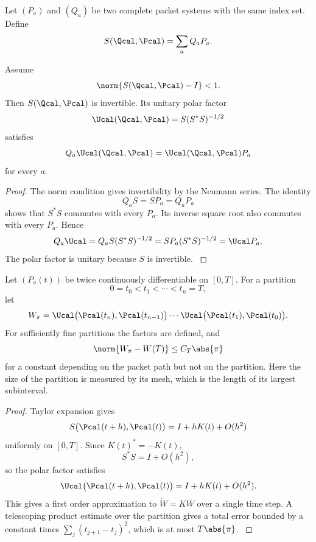 Let \((P_a)\) and \((Q_a)\) be two complete packet systems with the same index set. Define
\[
S(\Qcal,\Pcal)=\sum_aQ_aP_a.
\]

\begin{theorem}\label{strong:theorem:016}\label{strong:thm:direct_rotation}
Assume
\[
\norm{S(\Qcal,\Pcal)-I}<1.
\]
Then \(S(\Qcal,\Pcal)\) is invertible. Its unitary polar factor
\[
\Ucal(\Qcal,\Pcal)
=
S(S^*S)^{-1/2}
\]
satisfies
\[
Q_a\Ucal(\Qcal,\Pcal)
=
\Ucal(\Qcal,\Pcal)P_a
\]
for every \(a\).
\end{theorem}

\begin{proof}\label{strong:proof:025}
The norm condition gives invertibility by the Neumann series. The identity
\[
Q_aS=SP_a=Q_aP_a
\]
shows that \(S^*S\) commutes with every \(P_a\). Its inverse square root also commutes with every \(P_a\). Hence
\[
Q_a\Ucal
=Q_aS(S^*S)^{-1/2}
=SP_a(S^*S)^{-1/2}
=\Ucal P_a.
\]
The polar factor is unitary because \(S\) is invertible.
\label{strong:proof:025:end}\end{proof}

\begin{theorem}\label{strong:theorem:017}\label{strong:thm:short_rotation_convergence}
Let \((P_a(t))\) be twice continuously differentiable on \([0,T]\). For a partition
\[
0=t_0<t_1<\cdots<t_n=T,
\]
let
\[
W_\pi
=
\Ucal\bigl(\Pcal(t_n),\Pcal(t_{n-1})\bigr)
\cdots
\Ucal\bigl(\Pcal(t_1),\Pcal(t_0)\bigr).
\]
For sufficiently fine partitions the factors are defined, and
\[
\norm{W_\pi-W(T)}
\leq
C_T\abs{\pi}
\]
for a constant depending on the packet path but not on the partition. Here the size of the partition is measured by its mesh, which is the length of its largest subinterval.
\end{theorem}

\begin{proof}\label{strong:proof:026}
Taylor expansion gives
\[
S\bigl(\Pcal(t+h),\Pcal(t)\bigr)
=
I+hK(t)+O(h^2)
\]
uniformly on \([0,T]\). Since \(K(t)^*=-K(t)\),
\[
S^*S=I+O(h^2),
\]
so the polar factor satisfies
\[
\Ucal\bigl(\Pcal(t+h),\Pcal(t)\bigr)
=
I+hK(t)+O(h^2).
\]
This gives a first order approximation to \(\dot W=KW\) over a single time step. A telescoping product estimate over the partition gives a total error bounded by a constant times \(\sum_j(t_{j+1}-t_j)^2\), which is at most \(T\abs{\pi}\).
\label{strong:proof:026:end}\end{proof}

